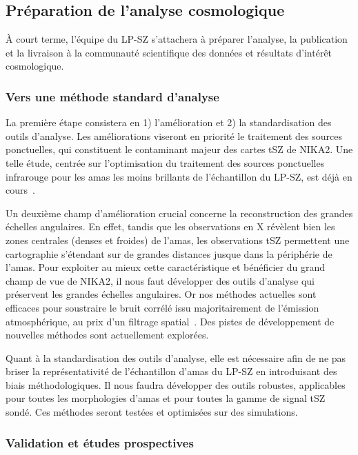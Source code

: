 \subsection{Préparation de l'analyse cosmologique}

\`A court terme, l'équipe du LP-SZ s'attachera à préparer l'analyse, la
publication et la livraison à la communauté scientifique des données
et résultats d'intérêt cosmologique.

\subsubsection{Vers une méthode standard d'analyse}
La première étape consistera en 1)
l'amélioration et 2) la standardisation des outils d'analyse. Les
améliorations viseront en priorité le traitement des sources
ponctuelles, qui constituent le contaminant majeur des cartes tSZ de
NIKA2. Une telle étude, centrée sur l'optimisation du traitement des
sources ponctuelles infrarouge pour les amas les moins brillants de
l'échantillon du LP-SZ, est déjà en cours~\citep{Keruzore2020}.

Un deuxième champ d'amélioration crucial concerne la reconstruction
des grandes échelles angulaires. En effet, tandis que les observations en X
révèlent bien les zones centrales (denses et froides) de l'amas, les
observations tSZ permettent une cartographie s'étendant sur de grandes
distances jusque dans la périphérie de l'amas. Pour exploiter au mieux
cette caractéristique et bénéficier du grand champ de vue de NIKA2, il
nous faut développer des outils d'analyse qui préservent les grandes
échelles angulaires. Or nos méthodes actuelles sont efficaces pour
soustraire le bruit corrélé issu majoritairement de l'émission
atmosphérique, au prix d'un filtrage spatial~\citep[voir par
  exemple][]{Ruppin2018}. Des pistes de développement de nouvelles
méthodes sont actuellement explorées.

Quant à la standardisation des outils d'analyse, elle est nécessaire
afin de ne pas briser la représentativité de l'échantillon d'amas du
LP-SZ en introduisant des biais méthodologiques. Il nous faudra
développer des outils robustes, applicables pour toutes les
morphologies d'amas et pour toutes la gamme de signal tSZ sondé. Ces
méthodes seront testées et optimisées sur des simulations.

\subsubsection{Validation et études prospectives}

